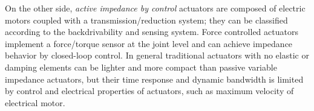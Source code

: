\par On the other side, {\em active impedance by control}  actuators are composed of electric motors coupled with a transmission/reduction system; they can be classified
according to the backdrivability and sensing system. Force controlled actuators implement a force/torque sensor
at the joint level and can achieve impedance behavior by closed-loop control.
In general traditional actuators with no elastic or damping elements can be lighter and more compact
than passive variable impedance actuators, but their time response and dynamic bandwidth is limited by control and electrical properties of actuators, such as maximum velocity of electrical motor.
%
%
%
%
%


